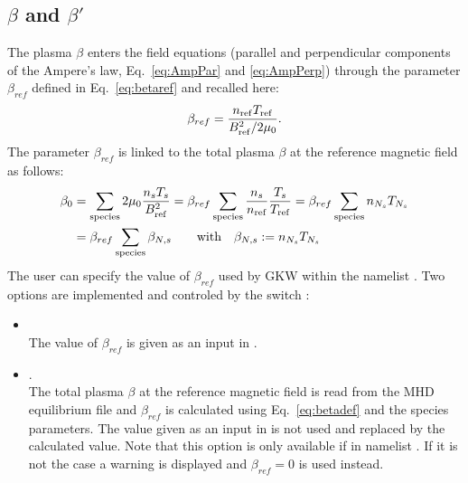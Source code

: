 \subsection{\texorpdfstring{$\beta$ and $\beta'$}{beta and beta prime}}
\label{Sec:betabetapr}
The plasma $\beta$ enters the field equations (parallel and perpendicular components of the Ampere's law, Eq.~\ref{eq:AmpPar} and
\ref{eq:AmpPerp}) through the parameter $\beta_{ref}$ defined in Eq.~\ref{eq:betaref} and recalled here:
\begin{equation}
 \beta_{ref} =  \frac{n_{\mathrm{ref}}T_{\mathrm{ref}}}{B^2_{\mathrm{ref}}/2\mu_0}.
\end{equation}
The parameter $\beta_{ref}$ is linked to the total plasma $\beta$ at the reference magnetic field as follows:
\begin{align}
\label{eq:betadef}
 \beta_0 &= \sum_{\mathrm{species}} 2\mu_0\frac{n_sT_s}{B^2_{\mathrm{ref}}} = \beta_{ref} \sum_{\mathrm{species}} \frac{n_s}{n_{\mathrm{ref}}}\frac{T_s}{T_{\mathrm{ref}}} = \beta_{ref}
\sum_{\mathrm{species}} n_{N_s} T_{N_s}\\
& = \beta_{ref} \sum_{\mathrm{species}} \beta_{N,s}\qquad\text{with}\quad \beta_{N,s} := n_{N_s} T_{N_s}
\end{align}
The user can specify the value of $\beta_{ref}$ used by GKW within the namelist . Two options are implemented and controled by
the switch :
\begin{itemize}
 \item {}\\
  The value of $\beta_{ref}$ is given as an input in .
 \item {}.\\
 The total plasma $\beta$ at the reference magnetic field is read from the MHD equilibrium file and $\beta_{ref}$ is calculated using Eq.~\ref{eq:betadef}
and the species parameters.  The value given as an input in  is not used and replaced by the calculated value. Note that this option is
only available if  in namelist . If it is not the case a warning is displayed and $\beta_{ref}=0$ is used instead. 
\end{itemize}


